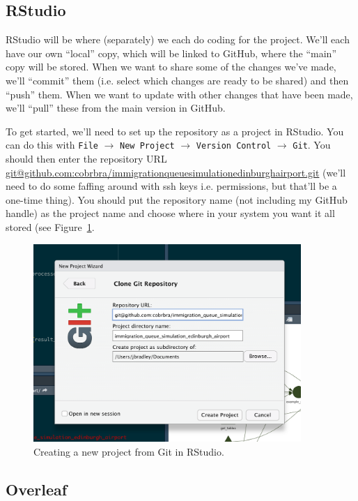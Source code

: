\documentclass[12pt]{article}
\begin{document}
\subsection{RStudio}
RStudio will be where (separately) we each do coding for the project. We'll each have our own ``local'' copy, which will be linked to GitHub, where the ``main'' copy will be stored. When we want to share some of the changes we've made, we'll ``commit'' them (i.e. select which changes are ready to be shared) and then ``push'' them. When we want to update with other changes that have been made, we'll ``pull'' these from the main version in GitHub. 

To get started, we'll need to set up the repository as a project in RStudio. You can do this with \texttt{File} $\rightarrow$ \texttt{New Project} $\rightarrow$ \texttt{Version Control} $\rightarrow$ \texttt{Git}. You should then enter the repository URL \href{git@github.com:cobrbra/immigration_queue_simulation_edinburgh_airport.git}{git@github.com:cobrbra/immigration\textunderscore queue\textunderscore simulation\textunderscore edinburgh\textunderscore airport.git} (we'll need to do some faffing around with ssh keys i.e. permissions, but that'll be a one-time thing). You should put the repository name (not including my GitHub handle) as the project name and choose where in your system you want it all stored (see Figure~\ref{fig:rstudio_new_project}. 

\begin{figure}[htbp]
    \centering
    \includegraphics[width=4in]{figures/rstudio_new_project.png}
    \caption{Creating a new project from Git in RStudio.}
    \label{fig:rstudio_new_project}
\end{figure}

\subsection{Overleaf}
\end{document}
